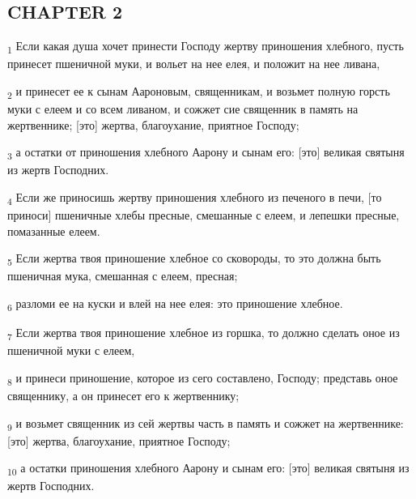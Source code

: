 \subsection{CHAPTER 2}
\begin{tcolorbox}
\textsubscript{1} Если какая душа хочет принести Господу жертву приношения хлебного, пусть принесет пшеничной муки, и вольет на нее елея, и положит на нее ливана,
\end{tcolorbox}
\begin{tcolorbox}
\textsubscript{2} и принесет ее к сынам Аароновым, священникам, и возьмет полную горсть муки с елеем и со всем ливаном, и сожжет сие священник в память на жертвеннике; [это] жертва, благоухание, приятное Господу;
\end{tcolorbox}
\begin{tcolorbox}
\textsubscript{3} а остатки от приношения хлебного Аарону и сынам его: [это] великая святыня из жертв Господних.
\end{tcolorbox}
\begin{tcolorbox}
\textsubscript{4} Если же приносишь жертву приношения хлебного из печеного в печи, [то приноси] пшеничные хлебы пресные, смешанные с елеем, и лепешки пресные, помазанные елеем.
\end{tcolorbox}
\begin{tcolorbox}
\textsubscript{5} Если жертва твоя приношение хлебное со сковороды, то это должна быть пшеничная мука, смешанная с елеем, пресная;
\end{tcolorbox}
\begin{tcolorbox}
\textsubscript{6} разломи ее на куски и влей на нее елея: это приношение хлебное.
\end{tcolorbox}
\begin{tcolorbox}
\textsubscript{7} Если жертва твоя приношение хлебное из горшка, то должно сделать оное из пшеничной муки с елеем,
\end{tcolorbox}
\begin{tcolorbox}
\textsubscript{8} и принеси приношение, которое из сего составлено, Господу; представь оное священнику, а он принесет его к жертвеннику;
\end{tcolorbox}
\begin{tcolorbox}
\textsubscript{9} и возьмет священник из сей жертвы часть в память и сожжет на жертвеннике: [это] жертва, благоухание, приятное Господу;
\end{tcolorbox}
\begin{tcolorbox}
\textsubscript{10} а остатки приношения хлебного Аарону и сынам его: [это] великая святыня из жертв Господних.
\end{tcolorbox}
